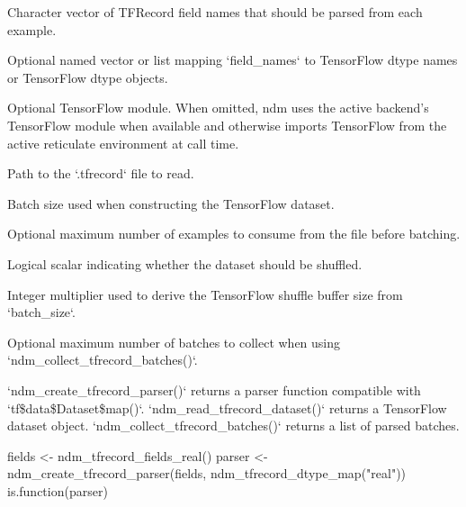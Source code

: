 \documentclass[a4paper]{book}
\begin{document}
\begin{Arguments}
\begin{ldescription}
\item[\code{field\_names}] Character vector of TFRecord field names that should be
parsed from each example.

\item[\code{dtype\_map}] Optional named vector or list mapping `field\_names` to
TensorFlow dtype names or TensorFlow dtype objects.

\item[\code{tensorflow}] Optional TensorFlow module. When omitted, ndm uses
the active backend's TensorFlow module when available and otherwise
imports TensorFlow from the active reticulate environment at call time.

\item[\code{file}] Path to the `.tfrecord` file to read.

\item[\code{batch\_size}] Batch size used when constructing the TensorFlow dataset.

\item[\code{max\_examples}] Optional maximum number of examples to consume from the
file before batching.

\item[\code{shuffle}] Logical scalar indicating whether the dataset should be
shuffled.

\item[\code{buffer\_scaler}] Integer multiplier used to derive the TensorFlow shuffle
buffer size from `batch\_size`.

\item[\code{max\_batches}] Optional maximum number of batches to collect when using
`ndm\_collect\_tfrecord\_batches()`.
\end{ldescription}
\end{Arguments}
%
\begin{Value}
`ndm\_create\_tfrecord\_parser()` returns a parser function compatible
with `tf\$data\$Dataset\$map()`. `ndm\_read\_tfrecord\_dataset()` returns a
TensorFlow dataset object. `ndm\_collect\_tfrecord\_batches()` returns a list
of parsed batches.
\end{Value}
%
\begin{Examples}
\begin{ExampleCode}
fields <- ndm_tfrecord_fields_real()
parser <- ndm_create_tfrecord_parser(fields, ndm_tfrecord_dtype_map("real"))
is.function(parser)

\end{ExampleCode}
\end{Examples}
\end{document}
